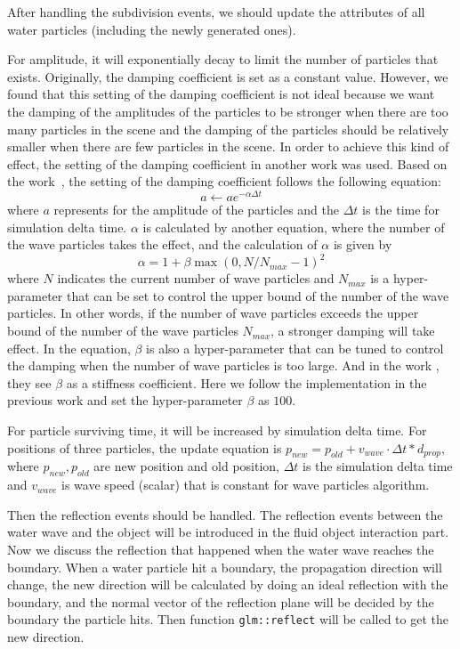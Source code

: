 \documentclass[acmtog]{acmart}
\begin{document}
After handling the subdivision events, we should update the attributes of all water particles (including the newly generated ones). 

For amplitude, it will exponentially decay to limit the number of particles that exists. 
Originally, the damping coefficient is set as a constant value. 
However, we found that this setting of the damping coefficient is not ideal because we want the damping of the amplitudes of the particles to be stronger when there are too many particles in the scene and the damping of the particles should be relatively smaller when there are few particles in the scene. 
In order to achieve this kind of effect, the setting of the damping coefficient in another work was used. 
Based on the work~\cite{jeschke2017water}, the setting of the damping coefficient follows the following equation: 
\begin{equation*}
    a \leftarrow a e^{-\alpha \Delta t}
\end{equation*}
where $a$ represents for the amplitude of the particles and the $\Delta t$ is the time for simulation delta time.
$\alpha$ is calculated by another equation, where the number of the wave particles takes the effect, and the calculation of $\alpha$ is given by 
\begin{equation*}
    \alpha = 1 + \beta \max(0, N / N_{max} - 1)^2
\end{equation*}
where $N$ indicates the current number of wave particles and $N_{max}$ is a hyper-parameter that can be set to control the upper bound of the number of the wave particles. 
In other words, if the number of wave particles exceeds the upper bound of the number of the wave particles $N_{max}$, a stronger damping will take effect. 
In the equation, $\beta$ is also a hyper-parameter that can be tuned to control the damping when the number of wave particles is too large. 
And in the work \cite{jeschke2017water}, they see $\beta$ as a stiffness coefficient. 
Here we follow the implementation in the previous work and set the hyper-parameter $\beta$ as $100$. 

For particle surviving time, it will be increased by simulation delta time. 
For positions of three particles, the update equation is $p_{new}=p_{old}+v_{wave}\cdot \Delta t * d_{prop}$, where $p_{new},p_{old}$ are new position and old position, $\Delta t$ is the simulation delta time and $v_{wave}$ is wave speed (scalar) that is constant for wave particles algorithm.

Then the reflection events should be handled. 
The reflection events between the water wave and the object will be introduced in the fluid object interaction part. 
Now we discuss the reflection that happened when the water wave reaches the boundary. 
When a water particle hit a boundary, the propagation direction will change, the new direction will be calculated by doing an ideal reflection with the boundary, and the normal vector of the reflection plane will be decided by the boundary the particle hits. 
Then function \verb|glm::reflect| will be called to get the new direction.
\end{document}

